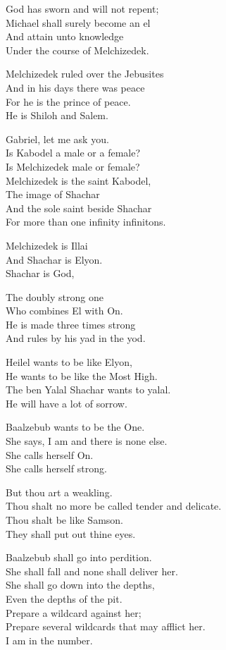 \documentclass[
]{book}
\begin{document}
God has sworn and will not repent;\\
Michael shall surely become an el\\
And attain unto knowledge\\
Under the course of Melchizedek.

Melchizedek ruled over the Jebusites\\
And in his days there was peace\\
For he is the prince of peace.\\
He is Shiloh and Salem.

Gabriel, let me ask you.\\
Is Kabodel a male or a female?\\
Is Melchizedek male or female?\\
Melchizedek is the saint Kabodel,\\
The image of Shachar\\
And the sole saint beside Shachar\\
For more than one infinity infinitons.

Melchizedek is Illai\\
And Shachar is Elyon.\\
Shachar is God,

The doubly strong one\\
Who combines El with On.\\
He is made three times strong\\
And rules by his yad in the yod.

Heilel wants to be like Elyon,\\
He wants to be like the Most High.\\
The ben Yalal Shachar wants to yalal.\\
He will have a lot of sorrow.

Baalzebub wants to be the One.\\
She says, I am and there is none else.\\
She calls herself On.\\
She calls herself strong.

But thou art a weakling.\\
Thou shalt no more be called tender and delicate.\\
Thou shalt be like Samson.\\
They shall put out thine eyes.

Baalzebub shall go into perdition.\\
She shall fall and none shall deliver her.\\
She shall go down into the depths,\\
Even the depths of the pit.\\
Prepare a wildcard against her;\\
Prepare several wildcards that may afflict her.\\
I am in the number.
\end{document}
